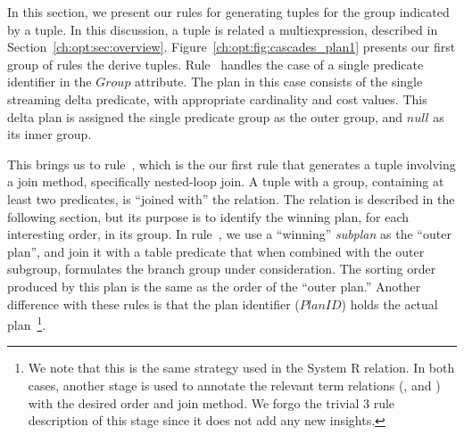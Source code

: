 In this section, we present our rules for generating  tuples for the
group indicated by a  tuple.  In this discussion, a  tuple
is related a multiexpression, described in Section~\ref{ch:opt:sec:overview}.
Figure~\ref{ch:opt:fig:cascades_plan1} presents our first group of rules the
derive  tuples.  Rule~ handles the case of a single predicate
identifier in the $Group$ attribute.  The plan in this case consists of the
single streaming delta predicate, with appropriate cardinality and cost values.
This delta plan is assigned the single predicate group as the outer group, and
$null$ as its inner group.

This brings us to rule~, which is the our first rule that generates a
 tuple involving a join method, specifically nested-loop join.  A
 tuple with a group, containing at least two predicates, is ``joined
with'' the  relation.  The  relation is described in the
following section, but its purpose is to identify the winning plan, for each
interesting order, in its group.  In rule~, we use a ``winning'' {\em
subplan} as the ``outer plan'', and join it with a table predicate that when
combined with the outer subgroup, formulates the branch group under
consideration.  The sorting order produced by this plan is the same as the
order of the ``outer plan.'' Another difference with these rules is that the
plan identifier ($PlanID$) holds the actual plan~\footnote{We note that this is the
same strategy used in the System R  relation.  In both cases, another
stage is used to annotate the relevant term relations (,
 and ) with the desired order and join method.
We forgo the trivial $3$ rule description of this stage since it does not add
any new insights.}.

